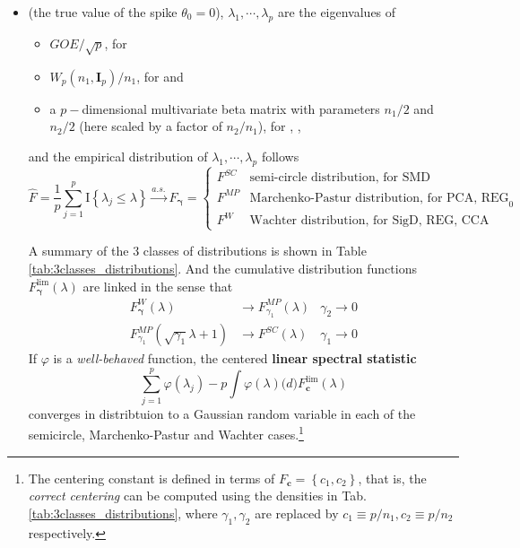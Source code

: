 \documentclass[twoside]{article}
\begin{document}
\begin{itemize}
    \item {} (the true value of the spike $\theta_0=0$), $\lambda_1,\cdots,\lambda_p$ are the eigenvalues of
    \begin{itemize}
        \item $GOE/\sqrt{p}$, for 
        \item $W_p(n_1,\mathbf{I}_p)/n_1$, for  and 
        \item a $p-$dimensional multivariate beta matrix with parameters $n_1/2$ and $n_2/2$ (here scaled by a factor of $n_2/n_1$), for , , 
    \end{itemize}
    and the empirical distribution of $\lambda_1,\cdots,\lambda_p$ follows
    $$
    \hat{F} = \frac{1}{p}\sum^p_{j=1}\mathrm{I}\left\{ \lambda_j \leq \lambda \right\} \xrightarrow{a.s.} F_{\boldsymbol{\gamma}} = \begin{cases}
        F^{SC} & \text{semi-circle distribution, for SMD}\\
        F^{MP} & \text{Marchenko-Pastur distribution, for PCA, REG}_0 \\
        F^{W} & \text{Wachter distribution, for SigD, REG, CCA}
    \end{cases}
    $$
    
    A summary of the 3 classes of distributions is shown in Table \ref{tab:3classes_distributions}. And the cumulative distribution functions $F_{\boldsymbol{\gamma}}^{\lim}(\lambda)$ are linked in the sense that 
    \begin{align*}
        F_{\boldsymbol{\gamma}}^W(\lambda) & \rightarrow F_{\gamma_1}^{MP}(\lambda) & \gamma_2\rightarrow 0\\
        F_{\gamma_1}^{MP}(\sqrt{\gamma_1}\lambda +1) & \rightarrow F^{SC}(\lambda) & \gamma_1\rightarrow 0
    \end{align*}
    If $\varphi$ is a \textit{well-behaved} function, the centered \textbf{linear spectral statistic}
    \begin{equation}
        \sum^p_{j=1}\varphi (\lambda_j) - p\int \varphi (\lambda) \mathrm(d)F_{\mathbf{c}}^{\lim}(\lambda)
    \end{equation}
    converges in distribtuion to a Gaussian random variable in each of the semicircle, Marchenko-Pastur and Wachter cases.\footnote{The centering constant is defined in terms of $F_{\mathbf{c}}=\left\{ c_1,c_2 \right\}$, that is, the \textit{correct centering} can be computed using the densities in Tab.\ref{tab:3classes_distributions}, where $\gamma_1,\gamma_2$ are replaced by $c_1\equiv p/n_1,c_2\equiv p/n_2$ respectively.}
    

\end{itemize}
\end{document}
